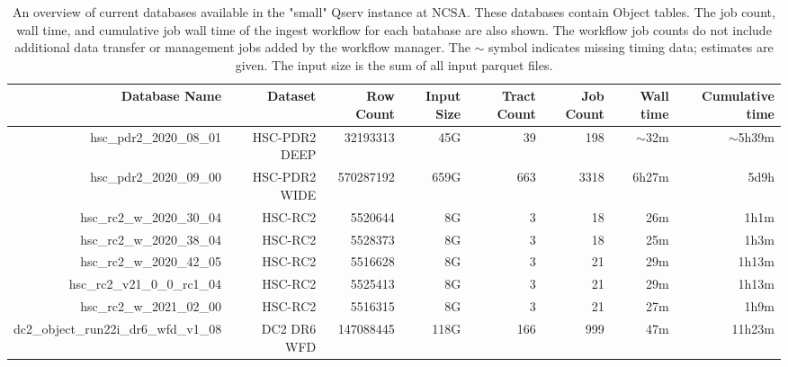 \begin{table}
\tiny
\centering
\begin{tabular} {|r|r|r|r|r|r|r|r|}
\hline
{Database Name}&{Dataset}&{Row Count}&{Input Size}&{Tract Count}&{Job Count}&{Wall time}&{Cumulative time}
\\ \hline
{hsc\_pdr2\_2020\_08\_01} & HSC-PDR2 DEEP & 32193313  & 45G & 39  & 198 & $\sim$32m & $\sim$5h39m \\
{hsc\_pdr2\_2020\_09\_00} & HSC-PDR2 WIDE & 570287192 & 659G & 663 & 3318 & 6h27m & 5d9h \\

{hsc\_rc2\_w\_2020\_30\_04} & HSC-RC2 & 5520644 & 8G & 3 & 18 & 26m & 1h1m  \\
{hsc\_rc2\_w\_2020\_38\_04} & HSC-RC2 & 5528373 & 8G & 3 & 18 & 25m & 1h3m \\
{hsc\_rc2\_w\_2020\_42\_05} & HSC-RC2 & 5516628 & 8G & 3 & 21 & 29m & 1h13m \\

{hsc\_rc2\_v21\_0\_0\_rc1\_04 } & HSC-RC2 & 5525413 & 8G & 3 & 21 & 29m & 1h13m \\
{hsc\_rc2\_w\_2021\_02\_00} & HSC-RC2 & 5516315 & 8G & 3 & 21 & 27m & 1h9m \\

{dc2\_object\_run22i\_dr6\_wfd\_v1\_08} & DC2 DR6 WFD & 147088445 & 118G & 166 & 999 & 47m & 11h23m \\
\hline
\end{tabular}
\caption{
An overview of current databases available in the "small" Qserv instance at NCSA.
These databases contain Object tables.
The job count, wall time, and cumulative job wall time of the ingest workflow for each batabase are also shown.
The workflow job counts do not include additional data transfer or management jobs added by the workflow manager.
The $\sim$ symbol indicates missing timing data; estimates are given.
The input size is the sum of all input parquet files.
}
\label{tab:examples}
\end{table}
